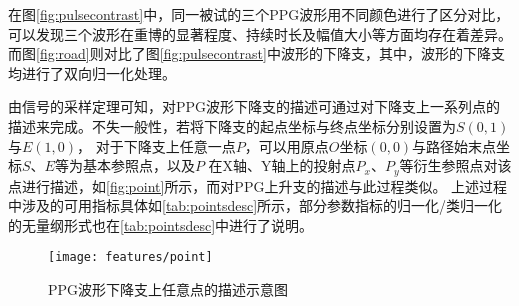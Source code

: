 在图\autoref{fig:pulsecontrast}中，同一被试的三个PPG波形用不同颜色进行了区分对比，可以发现三个波形在重博的显著程度、持续时长及幅值大小等方面均存在着差异。
而图\autoref{fig:road}则对比了图\autoref{fig:pulsecontrast}中波形的下降支，其中，波形的下降支均进行了双向归一化处理。

由信号的采样定理可知，对PPG波形下降支的描述可通过对下降支上一系列点的描述来完成。不失一般性，若将下降支的起点坐标与终点坐标分别设置为$S$$(0,1)$与$E$$(1,0)$，
对于下降支上任意一点$P$，可以用原点$O$坐标$(0,0)$与路径始末点坐标$S$、$E$等为基本参照点，以及$P$
在X轴、Y轴上的投射点$P_x$、$P_y$等衍生参照点对该点进行描述，如\autoref{fig:point}所示，而对PPG上升支的描述与此过程类似。
上述过程中涉及的可用指标具体如\autoref{tab:pointsdesc}所示，部分参数指标的归一化/类归一化的无量纲形式也在\autoref{tab:pointsdesc}中进行了说明。

\begin{figure}[htbp]
  \centering
  \texttt{[image: features/point]}
  \caption{\label{fig:point}PPG波形下降支上任意点的描述示意图}
\end{figure}

